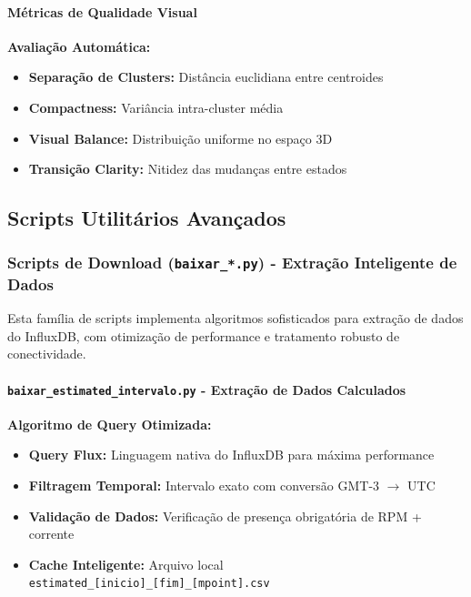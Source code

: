 \paragraph{Métricas de Qualidade Visual}

\textbf{Avaliação Automática:}
\begin{itemize}
    \item \textbf{Separação de Clusters:} Distância euclidiana entre centroides
    \item \textbf{Compactness:} Variância intra-cluster média
    \item \textbf{Visual Balance:} Distribuição uniforme no espaço 3D
    \item \textbf{Transição Clarity:} Nitidez das mudanças entre estados
\end{itemize}

\subsection{Scripts Utilitários Avançados}

\subsubsection{Scripts de Download (\texttt{baixar\_*.py}) - Extração Inteligente de Dados}

Esta família de scripts implementa algoritmos sofisticados para extração de dados do InfluxDB, com otimização de performance e tratamento robusto de conectividade.

\paragraph{\texttt{baixar\_estimated\_intervalo.py} - Extração de Dados Calculados}

\textbf{Algoritmo de Query Otimizada:}

\begin{itemize}
    \item \textbf{Query Flux:} Linguagem nativa do InfluxDB para máxima performance
    \item \textbf{Filtragem Temporal:} Intervalo exato com conversão GMT-3 $\rightarrow$ UTC
    \item \textbf{Validação de Dados:} Verificação de presença obrigatória de RPM + corrente
    \item \textbf{Cache Inteligente:} Arquivo local \texttt{estimated\_[inicio]\_[fim]\_[mpoint].csv}
\end{itemize}

